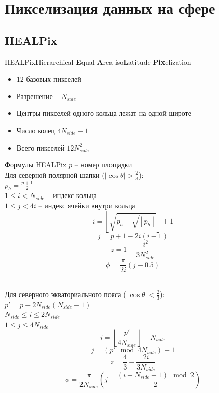 \documentclass{beamer}
\begin{document}
\section{Пикселизация данных на сфере}
\subsection{HEALPix}
\begin{frame}{HEALPix}{\textbf{H}ierarchical \textbf{E}qual \textbf{A}rea iso\textbf{L}atitude \textbf{Pix}elization}
\begin{itemize}
\item 12 базовых пикселей
\item Разрешение -- $N_{side}$
\item Центры пикселей одного кольца лежат на одной широте
\item Число колец $4N_{side}-1$
\item Всего пикселей $12N_{side}^2$
\end{itemize}
\end{frame}

\begin{frame}{Формулы HEALPix}
$p$ -- номер площадки\\
Для северной полярной шапки ($\left|\cos\theta\right|>\frac{2}{3}$):\\
$p_h=\frac{p+1}{2}$\\
$1\le i<N_{side}$ -- индекс кольца\\
$1\le j<4i$ -- индекс ячейки внутри кольца\\
$$i=\left\lfloor\sqrt{p_h-\sqrt{\left\lfloor p_h\right\rfloor}}\right\rfloor+1$$
$$j=p+1-2i\left(i-1\right)$$
$$z=1-\frac{i^2}{3N_{side}^2}$$
$$\phi=\frac{\pi}{2i}\left(j-0.5\right)$$\\
\end{frame}

\begin{frame}
Для северного экваториального пояса ($\left|\cos\theta\right|<\frac{2}{3}$):\\
$p'=p-2N_{side}\left(N_{side}-1\right)$\\
$N_{side}\le i\le 2N_{side}$\\
$1\le j\le 4N_{side}$
$$i=\left\lfloor\frac{p'}{4N_{side}}\right\rfloor + N_{side}$$
$$j=(p' \mod 4N_{side}) +1$$
$$z=\frac{4}{3}-\frac{2i}{3N_{side}}$$
$$\phi=\frac{\pi}{2N_{side}}\left(j-\frac{\left(i-N_{side}+1\right)\mod 2}{2}\right)$$
\end{frame}
\end{document}
